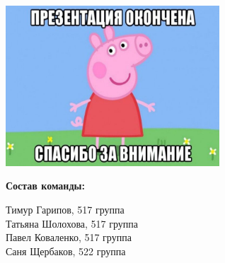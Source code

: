 \documentclass[unicode, dvipsnames]{beamer}
\begin{document}
\begin{frame}{}

\centering
\includegraphics[width=0.6\textwidth]{graphics/final.jpg}

\bigskip
\textbf{Состав команды:}

Тимур Гарипов, 517 группа \\ Татьяна Шолохова, 517 группа \\ Павел Коваленко, 517 группа \\ Саня Щербаков, 522 группа

\end{frame}
\end{document}
